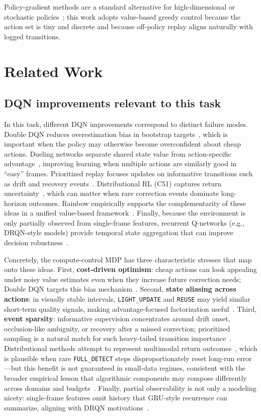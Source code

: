 \documentclass[letterpaper]{article}
\begin{document}
Policy-gradient methods are a standard alternative for high-dimensional or stochastic policies~\cite{sutton1999pg}; this work adopts value-based greedy control because the action set is tiny and discrete and because off-policy replay aligns naturally with logged transitions.

\section{Related Work}
\label{sec:related}
\subsection{DQN improvements relevant to this task}
In this task, different DQN improvements correspond to distinct failure modes. Double DQN reduces overestimation bias in bootstrap targets~\cite{vanhasselt2015double}, which is important when the policy may otherwise become overconfident about cheap actions. Dueling networks separate shared state value from action-specific advantage~\cite{wang2016dueling}, improving learning when multiple actions are similarly good in ``easy'' frames. Prioritized replay focuses updates on informative transitions such as drift and recovery events~\cite{schaul2015per}. Distributional RL (C51) captures return uncertainty~\cite{bellemare2017distributional}, which can matter when rare correction events dominate long-horizon outcomes. Rainbow empirically supports the complementarity of these ideas in a unified value-based framework~\cite{hessel2018rainbow}. Finally, because the environment is only partially observed from single-frame features, recurrent Q-networks (e.g., DRQN-style models) provide temporal state aggregation that can improve decision robustness~\cite{hausknecht2015drqn}.

Concretely, the compute-control MDP has three characteristic stresses that map onto these ideas. First, \textbf{cost-driven optimism}: cheap actions can look appealing under noisy value estimates even when they increase future correction needs; Double DQN targets this bias mechanism~\cite{vanhasselt2015double}. Second, \textbf{state aliasing across actions}: in visually stable intervals, \texttt{LIGHT\_UPDATE} and \texttt{REUSE} may yield similar short-term quality signals, making advantage-focused factorization useful~\cite{wang2016dueling}. Third, \textbf{event sparsity}: informative supervision concentrates around drift onset, occlusion-like ambiguity, or recovery after a missed correction; prioritized sampling is a natural match for such heavy-tailed transition importance~\cite{schaul2015per}. Distributional methods attempt to represent multimodal return outcomes~\cite{bellemare2017distributional}, which is plausible when rare \texttt{FULL\_DETECT} steps disproportionately reset long-run error---but this benefit is not guaranteed in small-data regimes, consistent with the broader empirical lesson that algorithmic components may compose differently across domains and budgets~\cite{hessel2018rainbow}. Finally, partial observability is not only a modeling nicety: single-frame features omit history that GRU-style recurrence can summarize, aligning with DRQN motivations~\cite{hausknecht2015drqn}.
\end{document}

